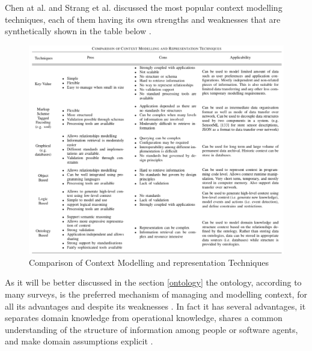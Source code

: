 \documentclass{thesisreport}
\begin{document}
 Chen at al. \cite{chen2000survey} and Strang et al. \cite{strang2004context} discussed the most popular context modelling techniques, each of them having its own strengths and weaknesses that are synthetically shown in the table below \cite{perera2014context}.
 
 	\begin{figure}[H]
		\centering
		\includegraphics[width=17.5cm]{Thesis/data/ContextModelComparison.png}
		\caption{Comparison of Context Modelling and representation Techniques \cite{perera2014context}}
		\label{fig:populationProspect}
	\end{figure}
 As it will be better discussed in the section \ref{ontology} the ontology, according to many surveys, is the preferred mechanism of managing and  modelling context, for all its advantages and despite its weaknesses \cite{perera2014context}.
 In fact it has several advantages, it separates domain knowledge from operational knowledge, shares a common understanding of the structure of information among people or software agents, and make domain assumptions explicit \cite{perera2014context}.
 
 
\end{document}
